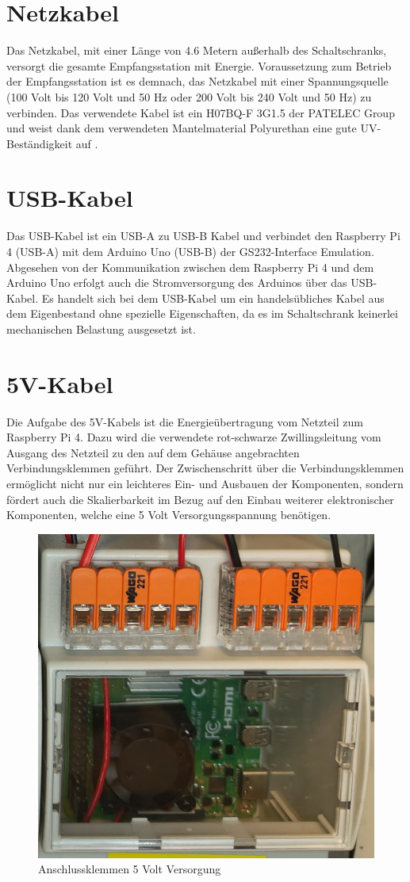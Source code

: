 \section{Netzkabel}
\label{sec:Netzkabel}
Das Netzkabel, mit einer Länge von 4.6 Metern außerhalb des Schaltschranks, versorgt die gesamte Empfangsstation mit Energie. Voraussetzung zum Betrieb der Empfangsstation ist es demnach, das Netzkabel mit einer Spannungsquelle (100 Volt bis 120 Volt und 50 Hz oder 200 Volt bis 240 Volt und 50 Hz) zu verbinden. Das verwendete Kabel ist ein H07BQ-F 3G1.5 der PATELEC Group \cite{noauthor_cables_nodate} und weist dank dem verwendeten Mantelmaterial Polyurethan eine gute UV-Beständigkeit auf \cite{noauthor_polyurethan_nodate}.

\section{USB-Kabel}
\label{sec:USB-Kabel}
Das USB-Kabel ist ein USB-A zu USB-B Kabel und verbindet den Raspberry Pi 4 (USB-A) mit dem Arduino Uno (USB-B) der GS232-Interface Emulation. Abgesehen von der Kommunikation zwischen dem Raspberry Pi 4 und dem Arduino Uno erfolgt auch die Stromversorgung des Arduinos über das USB-Kabel. Es handelt sich bei dem USB-Kabel um ein handelsübliches Kabel aus dem Eigenbestand ohne spezielle Eigenschaften, da es im Schaltschrank keinerlei mechanischen Belastung ausgesetzt ist.

\section{5V-Kabel}
\label{sec:5V-Kabel}
Die Aufgabe des 5V-Kabels ist die Energieübertragung vom Netzteil zum Raspberry Pi 4. Dazu wird die verwendete rot-schwarze Zwillingsleitung vom Ausgang des Netzteil zu den auf dem Gehäuse angebrachten Verbindungsklemmen geführt. Der Zwischenschritt über die Verbindungsklemmen ermöglicht nicht nur ein leichteres Ein- und Ausbauen der Komponenten, sondern fördert auch die Skalierbarkeit im Bezug auf den Einbau weiterer elektronischer Komponenten, welche eine 5 Volt Versorgungsspannung benötigen.

\begin{figure}[H]
	\centering
	\includegraphics[width=.25\linewidth]{../ref/Anschlussklemmen5V.jpeg}
	\caption{Anschlussklemmen 5 Volt Versorgung}
	\label{fig:anschlussklemmen}
\end{figure}

